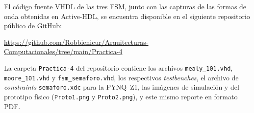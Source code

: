 \documentclass[12pt,letterpaper]{article}
\begin{document}
El código fuente VHDL de las tres FSM, junto con las capturas de las formas de onda obtenidas en Active-HDL, se encuentra disponible en el siguiente repositorio público de GitHub:
\begin{center}
\url{https://github.com/Robbienicur/Arquitecturas-Computacionales/tree/main/Practica-4}
\end{center}
La carpeta \texttt{Practica-4} del repositorio contiene los archivos \texttt{mealy\_101.vhd}, \texttt{moore\_101.vhd} y \texttt{fsm\_semaforo.vhd}, los respectivos \textit{testbenches}, el archivo de \textit{constraints} \texttt{semaforo.xdc} para la PYNQ~Z1, las imágenes de simulación y del prototipo físico (\texttt{Proto1.png} y \texttt{Proto2.png}), y este mismo reporte en formato PDF.
\end{document}
